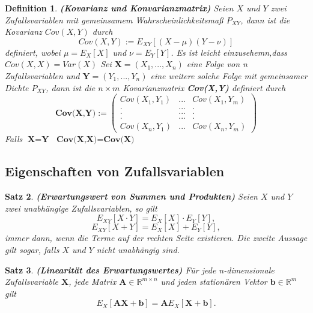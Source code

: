 \documentclass[12pt,a4paper]{scrartcl}
\newtheorem{Satz}{Satz}[section]
\newtheorem{Definition}[Satz]{Definition}
\numberwithin{equation}{section}
\newcommand{\R}{\mathbb{R}} %
\begin{document}
{\begin{Definition}\textbf{(Kovarianz und Konvarianzmatrix)}
 Seien $X$ und $Y$ zwei Zufallsvariablen mit gemeinsamem Wahrscheinlichkeitsmaß $P_{XY}$,
 dann ist die Kovarianz $Cov(X,Y)$ durch 
 $$
 Cov(X,Y) := E_{XY}[(X-\mu)(Y-\nu)]
 $$
 definiert, wobei $\mu = E_{X}[X]$ und $\nu = E_{Y}[Y]$. Es ist leicht einzusehemn,dass $Cov(X,X) = Var(X)$
 Sei $\textbf{X} = (X_{1},...,X_{n})$ eine Folge von n Zufallsvariablen und $\textbf{Y} = (Y_{1},...,Y_{n})$
 eine weitere solche Folge mit gemeinsamer Dichte $P_{XY}$, dann ist die $n \times m$ Kovarianzmatrix
 \textbf{Cov(X,Y)} definiert durch
 $$
 \textbf{Cov(X,Y)} := 
 \begin{pmatrix}
  Cov(X_{1},Y_{1}) 	& ... 	& Cov(X_{1},Y_{m})  	\\
  . 			& ... 	& .  			\\
  . 			& ... 	& .			\\
  . 			& ... 	& .		  	\\
  Cov(X_{n},Y_{1}) 	& ...	& Cov(X_{n},Y_{m}) 
 \end{pmatrix}
 $$
 Falls $\textbf{X} = \textbf{Y}$ $\textbf{Cov(X,X)} = \textbf{Cov(X)}$
 \end{Definition}
 
 \subsection{Eigenschaften von Zufallsvariablen}
 
 \begin{Satz}\textbf{(Erwartungswert von Summen und Produkten)}
  Seien $X$ und $Y$ zwei unabhängige Zufallsvariablen, so gilt
  \begin{equation}
  E_{XY}[X \cdot Y] = E_{X}[X] \cdot E_{Y}[Y], 
  \end{equation}
\begin{equation}
  E_{XY}[X + Y] = E_{X}[X] + E_{Y}[Y], 
  \end{equation}
  immer dann, wenn die Terme auf der rechten Seite existieren. Die zweite Aussage gilt sogar, falls
  $X$ und $Y$ nicht unabhängig sind. 
 \end{Satz}

 \begin{Satz}\textbf{(Linearität des Erwartungswertes)}
  Für jede n-dimensionale Zufallsvariable $\textbf{X}$, jede Matrix $\textbf{A} \in \R^{m \times n}$
  und jeden stationären Vektor $\textbf{b} \in \R^{m}$ gilt
  $$
  E_{X}[\textbf{AX} + \textbf{b}] = \textbf{A}E_{X}[\textbf{X} + \textbf{b}].
  $$
  \end{Satz}
  
}
\end{document}
